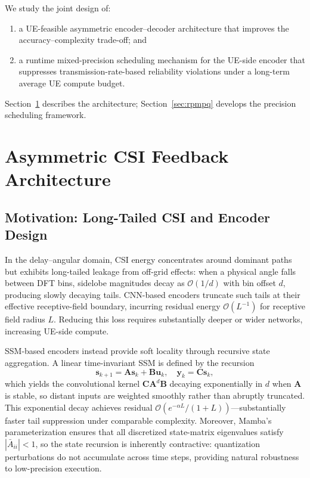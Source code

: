 \documentclass[conference]{IEEEtran}
\begin{document}
We study the joint design of:
\begin{enumerate}
\item a UE-feasible asymmetric encoder--decoder architecture that improves the accuracy--complexity trade-off; and
\item a runtime mixed-precision scheduling mechanism for the UE-side encoder that suppresses transmission-rate-based reliability violations under a long-term average UE compute budget.
\end{enumerate}
Section~\ref{sec:asym_arch} describes the architecture; Section~\ref{sec:rpmpq} develops the precision scheduling framework.

\section{Asymmetric CSI Feedback Architecture}
\label{sec:asym_arch}

\subsection{Motivation: Long-Tailed CSI and Encoder Design}
\label{subsec:motivation}

In the delay--angular domain, CSI energy concentrates around dominant paths but exhibits long-tailed leakage from off-grid effects: when a physical angle falls between DFT bins, sidelobe magnitudes decay as $\mathcal{O}(1/d)$ with bin offset $d$, producing slowly decaying tails.
CNN-based encoders truncate such tails at their effective receptive-field boundary, incurring residual energy $\mathcal{O}(L^{-1})$ for receptive field radius $L$.
Reducing this loss requires substantially deeper or wider networks, increasing UE-side compute.

SSM-based encoders instead provide soft locality through recursive state aggregation.
A linear time-invariant SSM is defined by the recursion
\begin{equation}
\mathbf{s}_{k+1}=\mathbf{A}\mathbf{s}_k+\mathbf{B}\mathbf{u}_k,
\quad
\mathbf{y}_k=\mathbf{C}\mathbf{s}_k,
\label{eq:ssm}
\end{equation}
which yields the convolutional kernel $\mathbf{C}\mathbf{A}^{d}\mathbf{B}$ decaying exponentially in $d$ when $\mathbf{A}$ is stable, so distant inputs are weighted smoothly rather than abruptly truncated.
This exponential decay achieves residual $\mathcal{O}(e^{-\alpha L}/(1+L))$---substantially faster tail suppression under comparable complexity.
Moreover, Mamba's parameterization ensures that all discretized state-matrix eigenvalues satisfy $|\bar{A}_{ii}|<1$, so the state recursion is inherently contractive: quantization perturbations do not accumulate across time steps, providing natural robustness to low-precision execution.
\end{document}
